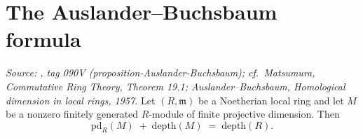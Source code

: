 \section{The Auslander--Buchsbaum formula}
\label{sec:ab_main}

\begin{theorem}\leanok
  \label{thm:auslander_buchsbaum}

  \textit{Source: \cite{stacks-project}, tag 090V (proposition-Auslander-Buchsbaum); cf.\
  Matsumura, \emph{Commutative Ring Theory}, Theorem 19.1; Auslander--Buchsbaum,
  \emph{Homological dimension in local rings}, 1957.}
  Let \((R, \mathfrak{m})\) be a Noetherian local ring and let \(M\) be a nonzero finitely
  generated \(R\)-module of finite projective dimension. Then
  \[
    \text{pd}_R(M) \;+\; \text{depth}(M) \;=\; \text{depth}(R).
  \]
\end{theorem}

